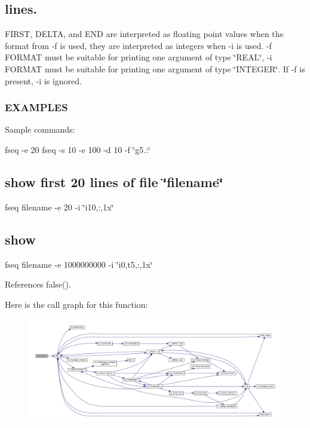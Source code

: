 \subsection*{lines.}

F\+I\+R\+ST, D\+E\+L\+TA, and E\+ND are interpreted as floating point values when the format from -\/f is used, they are interpreted as integers when -\/i is used. -\/f F\+O\+R\+M\+AT must be suitable for printing one argument of type \char`\"{}\+R\+E\+A\+L\char`\"{}, -\/i F\+O\+R\+M\+AT must be suitable for printing one argument of type \char`\"{}\+I\+N\+T\+E\+G\+E\+R\char`\"{}. If -\/f is present, -\/i is ignored. \subsubsection*{E\+X\+A\+M\+P\+L\+ES}

Sample commands\+:

fseq -\/e 20 fseq -\/s 10 -\/e 100 -\/d 10 -\/f \char`\"{}g5.\textquotesingle{}\textquotesingle{}\+:\textquotesingle{}\textquotesingle{}\char`\"{} \subsection*{show first 20 lines of file \char`\"{}filename\char`\"{}}

fseq filename -\/e 20 -\/i \char`\"{}i10,\textquotesingle{}\textquotesingle{}\+:\textquotesingle{}\textquotesingle{},1x\char`\"{} \subsection*{show}

fseq filename -\/e 1000000000 -\/i \char`\"{}i0,t5,\textquotesingle{}\textquotesingle{}\+:\textquotesingle{}\textquotesingle{},1x\char`\"{} 

References false().

Here is the call graph for this function\+:
\nopagebreak
\begin{figure}[H]
\begin{center}
\leavevmode
\includegraphics[width=350pt]{fseq_8f90_a39c21619b08a3c22f19e2306efd7f766_cgraph}
\end{center}
\end{figure}
